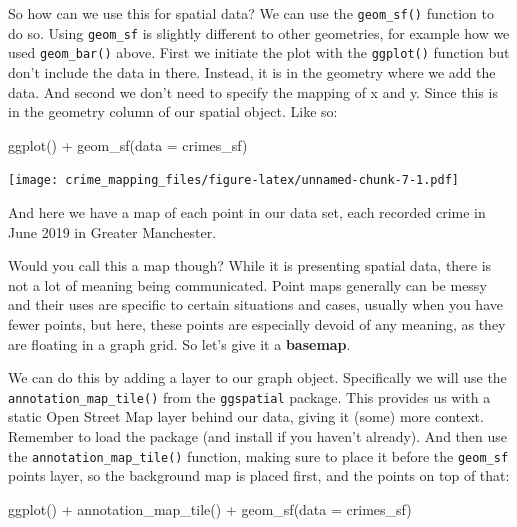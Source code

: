 \documentclass[
]{book}
\newenvironment{Shaded}{\begin{snugshade}}{\end{snugshade}}
\newcommand{\AttributeTok}[1]{\textcolor[rgb]{0.77,0.63,0.00}{#1}}
\newcommand{\FunctionTok}[1]{\textcolor[rgb]{0.00,0.00,0.00}{#1}}
\newcommand{\NormalTok}[1]{#1}
\newcommand{\SpecialCharTok}[1]{\textcolor[rgb]{0.00,0.00,0.00}{#1}}
\begin{document}
So how can we use this for spatial data? We can use the \texttt{geom\_sf()} function to do so. Using \texttt{geom\_sf} is slightly different to other geometries, for example how we used \texttt{geom\_bar()} above. First we initiate the plot with the \texttt{ggplot()} function but don't include the data in there. Instead, it is in the geometry where we add the data. And second we don't need to specify the mapping of x and y. Since this is in the geometry column of our spatial object. Like so:

\begin{Shaded}
\begin{Highlighting}[]
\FunctionTok{ggplot}\NormalTok{() }\SpecialCharTok{+} 
  \FunctionTok{geom\_sf}\NormalTok{(}\AttributeTok{data =}\NormalTok{ crimes\_sf)}
\end{Highlighting}
\end{Shaded}

\texttt{[image: crime\_mapping\_files/figure-latex/unnamed-chunk-7-1.pdf]}

And here we have a map of each point in our data set, each recorded crime in June 2019 in Greater Manchester.

Would you call this a map though? While it is presenting spatial data, there is not a lot of meaning being communicated. Point maps generally can be messy and their uses are specific to certain situations and cases, usually when you have fewer points, but here, these points are especially devoid of any meaning, as they are floating in a graph grid. So let's give it a \textbf{basemap}.

We can do this by adding a layer to our graph object. Specifically we will use the \texttt{annotation\_map\_tile()} from the \texttt{ggspatial} package. This provides us with a static Open Street Map layer behind our data, giving it (some) more context. Remember to load the package (and install if you haven't already). And then use the \texttt{annotation\_map\_tile()} function, making sure to place it before the \texttt{geom\_sf} points layer, so the background map is placed first, and the points on top of that:

\begin{Shaded}
\begin{Highlighting}[]
\FunctionTok{ggplot}\NormalTok{() }\SpecialCharTok{+} 
 \FunctionTok{annotation\_map\_tile}\NormalTok{() }\SpecialCharTok{+}
  \FunctionTok{geom\_sf}\NormalTok{(}\AttributeTok{data =}\NormalTok{ crimes\_sf)}
\end{Highlighting}
\end{Shaded}
\end{document}
